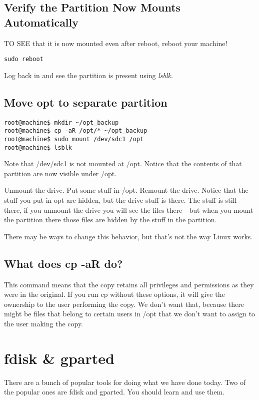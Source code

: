 \documentclass[10pt]{article}
\begin{document}
\subsection{Verify the Partition Now Mounts Automatically}

TO SEE that it is now mounted even after reboot, reboot your machine!

\begin{lstlisting}
sudo reboot
\end{lstlisting}

Log back in and see the partition is present using \textit{lsblk}.

\subsection{Move opt to separate partition}

\begin{lstlisting}
root@machine$ mkdir ~/opt_backup
root@machine$ cp -aR /opt/* ~/opt_backup  
root@machine$ sudo mount /dev/sdc1 /opt
root@machine$ lsblk
\end{lstlisting}

Note that /dev/sdc1 is not mounted at /opt. Notice that the contents of that partition are now visible under /opt.

Unmount the drive. Put some stuff in /opt. Remount the drive. Notice that the stuff you put in opt are hidden, but the drive stuff is there. 
The stuff is still there, if you unmount the drive you will see the files there - but when you mount the partition there those files are hidden by the stuff in the partition.

There may be ways to change this behavior, but that's not the way Linux works. 

\subsection{What does cp -aR do?}
This command means that the copy retains all privileges and permissions as they were in the original. If you run cp without these options, it will give the ownership to the user performing the copy. We don't want that, because there might be files that belong to certain users in /opt that we don't want to assign to the user making the copy.

\section{fdisk \& gparted}
There are a bunch of popular tools for doing what we have done today. Two of the popular ones are fdisk and gparted. You should learn and use them.
\end{document}
